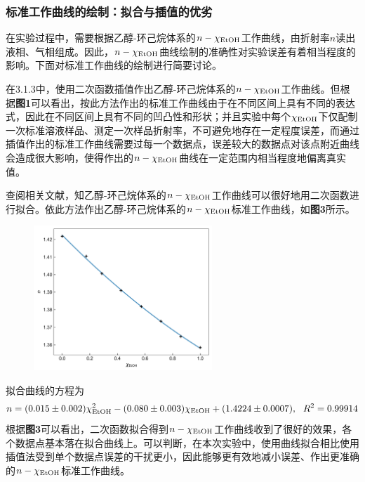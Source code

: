 \documentclass[12pt]{article}
\begin{document}
 			\subsubsection{标准工作曲线的绘制：拟合与插值的优劣}
 			在实验过程中，需要根据乙醇-环己烷体系的$n-\chi_{\ce{EtOH}}$工作曲线，由折射率$n$读出液相、气相组成。因此，$n-\chi_{\ce{EtOH}}$曲线绘制的准确性对实验误差有着相当程度的影响。下面对标准工作曲线的绘制进行简要讨论。\par 
 			在3.1.3中，使用二次函数插值作出乙醇-环己烷体系的$n-\chi_{\ce{EtOH}}$工作曲线。但根据\textbf{图1}可以看出，按此方法作出的标准工作曲线由于在不同区间上具有不同的表达式，因此在不同区间上具有不同的凹凸性和形状；并且实验中每个$\chi_{\ce{EtOH}}$下仅配制一次标准溶液样品、测定一次样品折射率，不可避免地存在一定程度误差，而通过插值作出的标准工作曲线需要过每一个数据点，误差较大的数据点对该点附近曲线会造成很大影响，使得作出的$n-\chi_{\ce{EtOH}}$曲线在一定范围内相当程度地偏离真实值。\par 
 			查阅相关文献\citealp{wenxian1}，知乙醇-环己烷体系的$n-\chi_{\ce{EtOH}}$工作曲线可以很好地用二次函数进行拟合。依此方法作出乙醇-环己烷体系的$n-\chi_{\ce{EtOH}}$标准工作曲线，如\textbf{图3}所示。
 		\begin{figure}[h]
 			\centering
 			\includegraphics[width=0.6\textwidth]{3.jpg}
 		\end{figure}
 		\par
 		拟合曲线的方程为
 		$$
 		n=(0.015\pm 0.002)\chi^{2}_{\ce{EtOH}}-(0.080\pm 0.003)\chi_{\ce{EtOH}}+(1.4224\pm 0.0007),\  \ R^{2}=0.99914
 		$$
 		根据\textbf{图3}可以看出，二次函数拟合得到$n-\chi_{\ce{EtOH}}$工作曲线收到了很好的效果，各个数据点基本落在拟合曲线上。可以判断，在本次实验中，使用曲线拟合相比使用插值法受到单个数据点误差的干扰更小，因此能够更有效地减小误差、作出更准确的$n-\chi_{\ce{EtOH}}$标准工作曲线。
 	\par 
\end{document}
